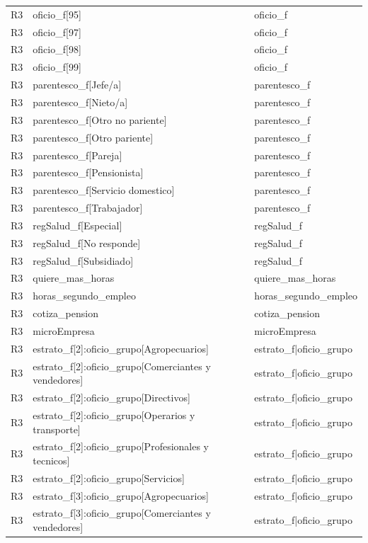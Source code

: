 \begin{longtable}{lll}
R3 & oficio\_f[95] & oficio\_f \\
R3 & oficio\_f[97] & oficio\_f \\
R3 & oficio\_f[98] & oficio\_f \\
R3 & oficio\_f[99] & oficio\_f \\
R3 & parentesco\_f[Jefe/a] & parentesco\_f \\
R3 & parentesco\_f[Nieto/a] & parentesco\_f \\
R3 & parentesco\_f[Otro no pariente] & parentesco\_f \\
R3 & parentesco\_f[Otro pariente] & parentesco\_f \\
R3 & parentesco\_f[Pareja] & parentesco\_f \\
R3 & parentesco\_f[Pensionista] & parentesco\_f \\
R3 & parentesco\_f[Servicio domestico] & parentesco\_f \\
R3 & parentesco\_f[Trabajador] & parentesco\_f \\
R3 & regSalud\_f[Especial] & regSalud\_f \\
R3 & regSalud\_f[No responde] & regSalud\_f \\
R3 & regSalud\_f[Subsidiado] & regSalud\_f \\
R3 & quiere\_mas\_horas & quiere\_mas\_horas \\
R3 & horas\_segundo\_empleo & horas\_segundo\_empleo \\
R3 & cotiza\_pension & cotiza\_pension \\
R3 & microEmpresa & microEmpresa \\
R3 & estrato\_f[2]:oficio\_grupo[Agropecuarios] & estrato\_f|oficio\_grupo \\
R3 & estrato\_f[2]:oficio\_grupo[Comerciantes y vendedores] & estrato\_f|oficio\_grupo \\
R3 & estrato\_f[2]:oficio\_grupo[Directivos] & estrato\_f|oficio\_grupo \\
R3 & estrato\_f[2]:oficio\_grupo[Operarios y transporte] & estrato\_f|oficio\_grupo \\
R3 & estrato\_f[2]:oficio\_grupo[Profesionales y tecnicos] & estrato\_f|oficio\_grupo \\
R3 & estrato\_f[2]:oficio\_grupo[Servicios] & estrato\_f|oficio\_grupo \\
R3 & estrato\_f[3]:oficio\_grupo[Agropecuarios] & estrato\_f|oficio\_grupo \\
R3 & estrato\_f[3]:oficio\_grupo[Comerciantes y vendedores] & estrato\_f|oficio\_grupo \\

\end{longtable}
